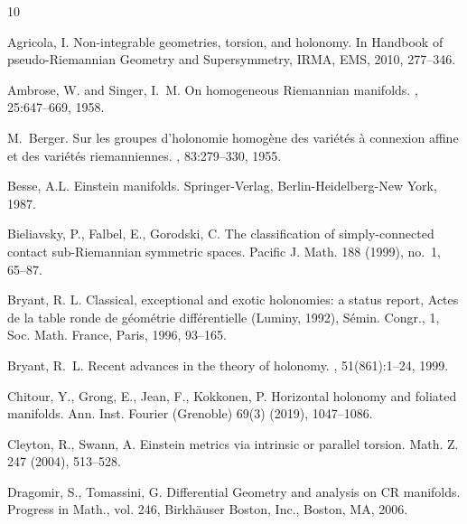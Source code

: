 \documentclass{amsart}
\theoremstyle{plain}
\theoremstyle{definition}
\newcommand{\1}{\mathbf{1}}
\newcommand{\+}{\oplus}
\newcommand{\tcom}[1]{
 \marginpar{{\scriptsize  T: #1 }}}
\begin{document}
\begin{thebibliography}{10}
	
		  Agricola, I.	Non-integrable geometries, torsion, and holonomy. In Handbook of pseudo-Riemannian Geometry and Supersymmetry, 	IRMA, EMS, 2010, 277--346.

	

Ambrose, W. and  Singer, I.~M.
\newblock On homogeneous {R}iemannian manifolds.
, 25:647--669, 1958.

M.~Berger.
\newblock Sur les groupes d'holonomie homog\`ene des vari\'et\'es \`a connexion
affine et des vari\'et\'es riemanniennes.
, 83:279--330, 1955.

	 Besse, A.L. Einstein manifolds. Springer-Verlag, 	Berlin-Heidelberg-New York, 1987.


Bieliavsky, P., Falbel, E., Gorodski, C. The classification of simply-connected contact sub-Riemannian symmetric spaces. Pacific J. Math. 188 (1999), no.~1, 65--87.



  Bryant, R. L. Classical, exceptional and exotic holonomies: a status report, Actes
de la table ronde de g\'eom\'etrie diff\'erentielle (Luminy, 1992), S\'emin. Congr., 1, Soc.
Math. France, Paris, 1996, 93–165.

 Bryant, R.~L.
\newblock Recent advances in the theory of holonomy.
, 51(861):1--24, 1999.



	
 Chitour, Y., Grong, E., Jean, F., Kokkonen, P. Horizontal holonomy and foliated manifolds. Ann. Inst.
Fourier (Grenoble) 69(3) (2019), 1047–1086.

 Cleyton, R., Swann, A.  Einstein metrics via intrinsic or parallel torsion. Math. Z. 247  (2004), 513--528.

Dragomir, S.,  Tomassini, G. Differential Geometry and analysis on CR manifolds. Progress in Math., vol. 246, Birkh\"auser Boston, Inc., Boston,
MA, 2006.



\end{thebibliography}
\end{document}
